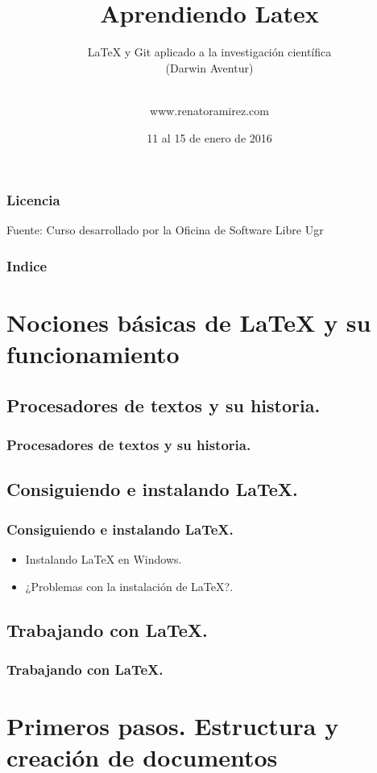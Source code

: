 \documentclass{beamer}
\title[Latex]{Aprendiendo Latex}
\subtitle{LaTeX y Git aplicado a la investigación científica\\ (Darwin Aventur)}
\author[Renato L. Ramírez Rivero]
{\\www.renatoramirez.com}
\date{11 al 15 de enero de 2016}
\begin{document}
\frame{\titlepage}

\begin{frame}
\frametitle{Licencia}
\doclicenseThis
Fuente: Curso desarrollado por la Oficina de Software Libre Ugr
\end{frame}

\begin{frame}
\frametitle{Indice}
{\tiny
\tableofcontents
}
\end{frame}

\section{Nociones básicas de LaTeX y su funcionamiento}
\subsection{Procesadores de textos y su historia.}

\begin{frame}
  \frametitle{Procesadores de textos y su historia.}
\end{frame}

\subsection{Consiguiendo e instalando LaTeX.}
\begin{frame}
  \frametitle{Consiguiendo e instalando LaTeX.}
  \begin{itemize}
  \item<1->{Instalando LaTeX en Windows.}
  \item<2->{¿Problemas con la instalación de LaTeX?.}
   \end{itemize}
\end{frame}


\subsection{Trabajando con LaTeX.}
\begin{frame}
  \frametitle{Trabajando con LaTeX.}
\end{frame}

\section{Primeros pasos. Estructura y creación de documentos}
\end{document}
